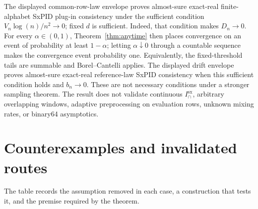 \documentclass[11pt]{article}
\theoremstyle{definition}
\newcommand{\sx}{\mathrm{sx}}
\begin{document}
	The displayed common-row-law envelope proves almost-sure exact-real finite-alphabet SxPID plug-in
	consistency under the sufficient condition $V_n\log(n)/n^2\to0$; fixed $d$ is sufficient.
	Indeed, that condition makes $D_n\to0$.  For every $\alpha\in(0,1)$,
	Theorem~\ref{thm:anytime} then places convergence on an event of probability at least
	$1-\alpha$; letting $\alpha\downarrow0$ through a countable sequence makes the convergence event
	probability one.  Equivalently, the fixed-threshold tails are summable and Borel--Cantelli
	applies.  The displayed drift
	envelope proves almost-sure exact-real reference-law SxPID consistency when this sufficient
condition holds and $b_n\to0$.  These are not necessary conditions under a stronger sampling
theorem.  The result does not
validate continuous $I_\cap^\sx$, arbitrary overlapping windows, adaptive preprocessing on
evaluation rows, unknown mixing rates, or binary64 asymptotics.

\section{Counterexamples and invalidated routes}

The table records the assumption removed in each case, a construction that tests it, and the
premise required by the theorem.
\end{document}
